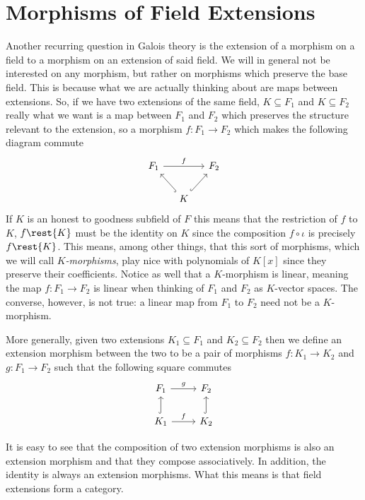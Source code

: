 \documentclass[12pt,oneside]{book}
\begin{document}
\section{Morphisms of Field Extensions}
Another recurring question in Galois theory is the extension of a morphism on a field to a
morphism on an extension of said field. We will in general not be interested on any
morphism, but rather on morphisms which preserve the base field. This is because what we
are actually thinking about are maps between extensions. So, if we have two extensions of
the same field, \( K \subseteq F_1 \) and \( K \subseteq F_2 \) really what we want is a
map between \( F_1 \)	and \( F_2 \) which preserves the structure relevant to the
extension, so a morphism \( f \colon F_1 \to F_2 \) which makes the following diagram
commute
\begin{equation*}
	\begin{tikzcd}[column sep=small]
		F_1 \arrow[rr, "f"] & & F_2	\\
											& K \arrow[ul, hook] \arrow[ur, hook] &
	\end{tikzcd}
\end{equation*}
If \( K \) is an honest to goodness subfield of \( F \) this means that the restriction of
\( f \) to \( K \), \( f\rest{K} \) must be the identity on \( K \) since the composition
\( f \circ \iota \) is precisely \( f \rest{K} \). This means, among other things, that
this sort of morphisms, which we will call \emph{\( K \)-morphisms}, play nice with
polynomials of \( K[x] \) since they preserve their coefficients. Notice as well that a \(
K \)-morphism is linear, meaning the map \( f \colon F_1 \to F_2 \) is linear when
thinking of \( F_1 \) and \( F_2 \) as \( K \)-vector spaces. The converse, however, is
not true: a linear map from \( F_1 \) to \( F_2 \) need not be a \( K \)-morphism.

More generally, given two extensions \( K_1 \subseteq F_1 \) and \( K_2 \subseteq F_2 \)
then we define an extension morphism between the two to be a pair of morphisms \( f \colon K_1
\to K_2	\) and \( g \colon F_1 \to F_2 \) such that the following square commutes
\begin{equation*}
	\begin{tikzcd}
		F_1 \arrow[r, "g"] & F_2 \\
		K_1 \arrow[r, "f"] \arrow[u, hook] & K_2 \arrow[u, hook]
	\end{tikzcd}
\end{equation*}

It is easy to see that the composition of two extension morphisms is also an extension
morphism and that they compose associatively. In addition, the identity is always an
extension morphisms. What this means is that field extensions form a category.
\end{document}

